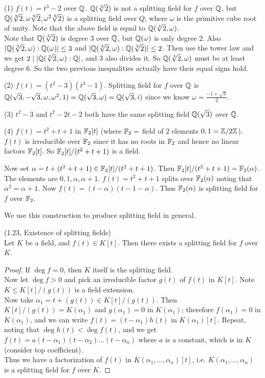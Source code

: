 \documentclass[a4paper]{article}
\begin{document}
\begin{eg}
(1) $f(t) = t^3-2$ over $\mathbb{Q}$. $\mathbb{Q}(\sqrt[3]{2})$ is not a splitting field for $f$ over $\mathbb{Q}$, but $\mathbb{Q}(\sqrt[3]{2},\omega \sqrt[3]{2},\omega^2 \sqrt[3]{2})$ is a splitting field over $Q$, where $\omega$ is the primitive cube root of unity. Note that the above field is equal to $\mathbb{Q}(\sqrt[3]{2},\omega)$.\\
Note that $\mathbb{Q}(\sqrt[3]{2})$ is degree $3$ over $\mathbb{Q}$, but $\mathbb{Q}(\omega)$ is only degree 2. Also $|\mathbb{Q}(\sqrt[3]{2},\omega):\mathbb{Q}(\omega)|\leq 3$ and $|\mathbb{Q}(\sqrt[3]{2},\omega) : \mathbb{Q}(\sqrt[3]{2})| \leq 2$. Then use the tower law and we get $2 \mid |\mathbb{Q}(\sqrt[3]{2},\omega):\mathbb{Q}|$, and $3$ also divides it. So $\mathbb{Q}(\sqrt[3]{2},\omega)$ must be at least degree 6. So the two previous inequalities actually have their equal signs hold.

(2) $f(t) = (t^2-3)(t^3-1)$. Splitting field for $f$ over $\mathbb{Q}$ is $\mathbb{Q}(\sqrt{3},-\sqrt{3},\omega,\omega^2,1) = \mathbb{Q}(\sqrt{3},\omega) = \mathbb{Q}(\sqrt{3},i)$ since we know $\omega = \frac{-1+\sqrt{3}}{2}$.

(3) $t^2-3$ and $t^2-2t-2$ both have the same splitting field $\mathbb{Q}(\sqrt{3})$ over $\mathbb{Q}$.

(4) $f(t) = t^2+t+1$ in $\mathbb{F}_2[t]$ (where $\mathbb{F}_2 =$ field of $2$ elements $0,1 = \mathbb{Z} / 2\mathbb{Z}$). $f(t)$ is irreducible over $\mathbb{F}_2$ since it has no roots in $\mathbb{F}_2$ and hence no linear factors $\mathbb{F}_2[t]$. So $\mathbb{F}_2[t] / (t^2+t+1)$ is a field.

Now set $\alpha = t+(t^2+t+1) \in \mathbb{F}_2[t] / (t^2+t+1)$. Then $\mathbb{F}_2[t] / (t^2+t+1) = \mathbb{F}_2(\alpha)$. The elements are $0,1,\alpha,\alpha+1$. $f(t) =t^2+t+1$ splits over $\mathbb{F}_2(\alpha)$  noting that $\alpha^2 = \alpha+1$. Now $f(t) = (t-\alpha)(t-1-\alpha)$. Thus $\mathbb{F}_2(\alpha)$ is splitting field for $f$ over $\mathbb{F}_2$.
\end{eg}

We use this construction to produce splitting field in general.

\begin{thm} (1.23, Existence of splitting fields)\\
Let $K$ be a field, and $f(t) \in K[t]$. Then there exists a splitting field for $f$ over $K$.
\begin{proof}
If $\deg f = 0$, then $K$ itself is the splitting field.\\
Now let $\deg f >0$ and pick an irreducible factor $g(t)$ of $f(t)$ in $K[t]$. Note $K \leq K[t] / (g(t))$ is a field extension.\\
Now take $\alpha_1 = t+(g(t)) \in K[t] / (g(t))$. Then $K[t] / (g(t)) = K(\alpha_1)$ and $g(\alpha_1) = 0$ in $K(\alpha_1)$; therefore $f(\alpha_1) = 0$ in $K(\alpha_1)$, and we can write $f(t) = (t-\alpha_1) h(t)$ in $K(\alpha_1)[t]$. Repeat, noting that $\deg h(t) < \deg f(t)$, and we get $f(t) = a(t-\alpha_1) (t-\alpha_2) ... (t-\alpha_n)$ where $a$ is a constant, which is in $K$ (consider top coefficient).\\
Thus we have a factorization of $f(t)$ in $K(\alpha_1,...,\alpha_n)[t]$, i.e. $K(\alpha_1,...,\alpha_n)$ is a splitting field for $f$ over $K$.
\end{proof}
\end{thm}
\end{document}
